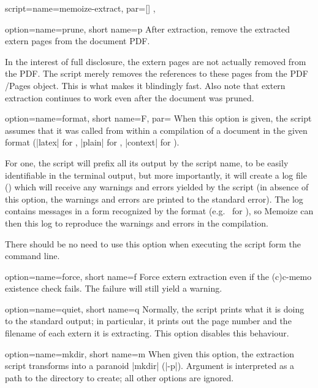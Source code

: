 \documentclass[a4paper,11pt]{article}
\begin{document}
\begin{doc}{
    script={name=memoize-extract, par=[] },
  }
  \begin{doc}{
      option={name=prune, short name=p}
    }
    After extraction, remove the extracted extern pages from the document PDF.

    In the interest of full disclosure, the extern pages are not actually
    removed from the PDF.  The script merely removes the references to these
    pages from the PDF /Pages object.  This is what makes it blindingly fast.
    Also note that extern extraction continues to work even after the document
    was pruned.
  \end{doc}
  \begin{doc}{
      option={name=format, short name=F,
        par=\Alt{}\Alt{}}
    }
    When this option is given, the script assumes that it was called from
    within a  compilation of a document in the given format
    (|latex| for , |plain| for , |context| for
    ).
    
    For one, the script will prefix all its output by the script name, to be
    easily identifiable in the terminal output, but more importantly, it will
    create a log file () which will receive any
    warnings and errors yielded by the script (in absence of this option, the
    warnings and errors are printed to the standard error).  The log contains
    messages in a form recognized by the format (e.g.\  for
    ), so Memoize can then  this log to reproduce the
    warnings and errors in the compilation.

    There should be no need to use this option when executing the script form
    the command line.
  \end{doc}
  \begin{doc}{
      option={name=force, short name=f}
    }
    Force extern extraction even if the (c)c-memo existence check fails.  The
    failure will still yield a warning.
  \end{doc}
  \begin{doc}{
      option={name=quiet, short name=q}
    }
    Normally, the script prints what it is doing to the standard output; in
    particular, it prints out the page number and the filename of each extern
    it is extracting.  This option disables this behaviour.
  \end{doc}
  \begin{doc}{
      option={name=mkdir, short name=m}
    }
    When given this option, the extraction script transforms into a paranoid
    |mkdir| (|-p|).  Argument  is interpreted as a path to the
    directory to create; all other options are ignored.


\end{doc}
\end{doc}
\end{document}
